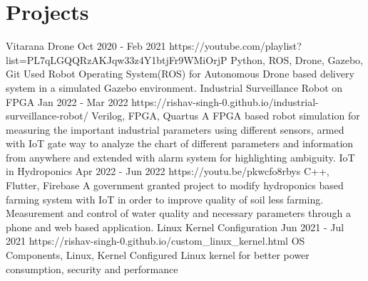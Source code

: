 \documentclass[%
               doublesided,
               paper=a4,
               fontsize=10pt
              ]{my-resume}
\begin{document}
{    \section[\faRocket]{Projects}
     \project
        {Vitarana Drone}
        {Oct 2020 - Feb 2021}
        {https://youtube.com/playlist?list=PL7qLGQQRzAKJqw33z4Y1btjFr9WMiOrjP}
        {Python, ROS, Drone, Gazebo, Git}
        {Used Robot Operating System(ROS) for Autonomous Drone based delivery system in a simulated Gazebo environment. }
     \project
        {Industrial Surveillance Robot on FPGA}
        {Jan 2022 - Mar 2022}
        {https://rishav-singh-0.github.io/industrial-surveillance-robot/}
        {Verilog, FPGA, Quartus}
        {A FPGA based robot simulation for measuring the important industrial parameters using different sensors, armed with IoT gate way to analyze the chart of different parameters and information from anywhere and extended with alarm system for highlighting ambiguity. }
     \project
        {IoT in Hydroponics}
        {Apr 2022 - Jun 2022}
        {https://youtu.be/pkwcfo8rbys}
        {C++, Flutter, Firebase}
        {A government granted project to modify hydroponics based farming system with IoT in order to improve quality of soil less farming.
        \\Measurement and control of water quality and necessary parameters through a phone and web based application. }
     \project
        {Linux Kernel Configuration}
        {Jun 2021 - Jul 2021}
        {https://rishav-singh-0.github.io/custom_linux_kernel.html}
        {OS Components, Linux, Kernel}
        {Configured Linux kernel for better power consumption, security and performance }
    
}
\end{document}
